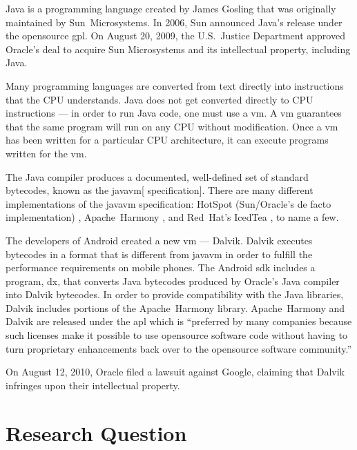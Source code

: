 \documentclass[11pt]{article}
\begin{document}
\begin{multicols}{2}
Java is a programming language created by James Gosling that was originally
maintained by Sun~Microsystems.  In 2006, Sun announced Java's release under the
\gls{opensource} \gls{gpl}. \cite{sun-open-sources-java} On August 20, 2009, the
U.S.~Justice Department approved Oracle's deal to acquire Sun Microsystems and
its intellectual property, including Java. \cite{oracle-buys-sun}

Many programming languages are converted from text directly into instructions
that the CPU understands.  Java does not get converted directly to CPU
instructions --- in order to run Java code, one must use a \gls{vm}.  A \gls{vm}
guarantees that the same program will run on any CPU without modification.  Once
a \gls{vm} has been written for a particular CPU architecture, it can execute
programs written for the \gls{vm}.

The Java compiler produces a documented, well-defined set of standard
\glspl{bytecode}, known as the \gls{javavm}[ specification]. \cite[Chapter
4]{javavm-bytecode}  There are many different implementations of the
\gls{javavm} specification: HotSpot (Sun/Oracle's de facto implementation)
\cite{hotspot}, Apache~Harmony \cite{apache-harmony}, and Red~Hat's IcedTea
\cite{icedtea}, to name a few.

The developers of Android created a new \gls{vm} --- Dalvik.  Dalvik executes
\glspl{bytecode} in a format that is different from \gls{javavm} in order to
fulfill the performance requirements on mobile phones.  \cite{dalvik-bytecode}
\cite{dalvik-vm-arch} The Android \gls{sdk} includes a program, dx, that
converts Java \glspl{bytecode} produced by Oracle's Java compiler into Dalvik
\glspl{bytecode}.  \cite{android-sdk-building} In order to provide compatibility
with the Java libraries, Dalvik includes portions of the Apache~Harmony library.
\cite{apache-harmony} \cite{dalvik-readme}  Apache~Harmony and Dalvik are
released under the \gls{apl} \cite{apache-license} which is ``preferred by many
companies because such licenses make it possible to use \gls{opensource}
software code without having to turn proprietary enhancements back over to the
\gls{opensource} software community.'' \cite{why-apache2-license}

On August 12, 2010, Oracle filed a lawsuit against Google, claiming that Dalvik
infringes upon their intellectual property. \cite[Count VIII]{oracle-lawsuit}


\section{Research Question} %
\label{sec:question}


\end{multicols}
\end{document}
